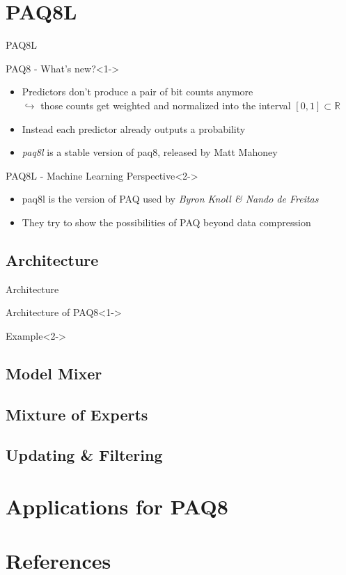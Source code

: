 \documentclass[11pt,usenames,dvipsnames]{beamer}
\begin{document}
\section{PAQ8L}
\begin{frame}{PAQ8L}
	\begin{exampleblock}{PAQ8 - What's new?}<1->
		\begin{itemize}
			\item Predictors don't produce a pair of bit counts anymore\\
			$\hookrightarrow$ those counts get weighted and normalized into the interval $[0,1]\subset\mathbb{R}$
			\item Instead  each predictor already outputs a probability
			\item \textit{paq8l} is a stable version of paq8, released by Matt Mahoney
		\end{itemize}
	\end{exampleblock}
	
		\begin{alertblock}{PAQ8L - Machine Learning Perspective}<2->
		\begin{itemize}
			\item paq8l is the version of PAQ used by \textit{Byron Knoll \& Nando de Freitas}
			\item They try to show the possibilities of PAQ beyond data compression
		\end{itemize}
	\end{alertblock}
\end{frame}

\subsection{Architecture}
\begin{frame}{Architecture}
	\begin{exampleblock}{Architecture of PAQ8}<1->
	
	\end{exampleblock}
	
	\begin{block}{Example}<2->
	\end{block}

\end{frame}


\subsection{Model Mixer}
\subsection{Mixture of Experts}
\subsection{Updating \& Filtering}
\section{Applications for PAQ8}
\section{References}
\end{document}
